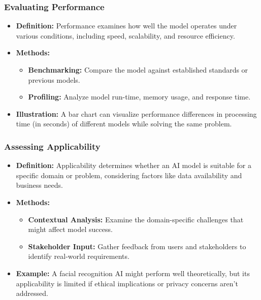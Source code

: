 \documentclass[aspectratio=169]{beamer}
\begin{document}
\begin{frame}[fragile]
    \frametitle{Evaluating Performance}
    \begin{itemize}
        \item \textbf{Definition:} Performance examines how well the model operates under various conditions, including speed, scalability, and resource efficiency.
        \item \textbf{Methods:}
        \begin{itemize}
            \item \textbf{Benchmarking:} Compare the model against established standards or previous models.
            \item \textbf{Profiling:} Analyze model run-time, memory usage, and response time.
        \end{itemize}
        \item \textbf{Illustration:} A bar chart can visualize performance differences in processing time (in seconds) of different models while solving the same problem.
    \end{itemize}
\end{frame}

\begin{frame}[fragile]
    \frametitle{Assessing Applicability}
    \begin{itemize}
        \item \textbf{Definition:} Applicability determines whether an AI model is suitable for a specific domain or problem, considering factors like data availability and business needs.
        \item \textbf{Methods:}
        \begin{itemize}
            \item \textbf{Contextual Analysis:} Examine the domain-specific challenges that might affect model success.
            \item \textbf{Stakeholder Input:} Gather feedback from users and stakeholders to identify real-world requirements.
        \end{itemize}
        \item \textbf{Example:} A facial recognition AI might perform well theoretically, but its applicability is limited if ethical implications or privacy concerns aren't addressed.
    \end{itemize}
\end{frame}
\end{document}
